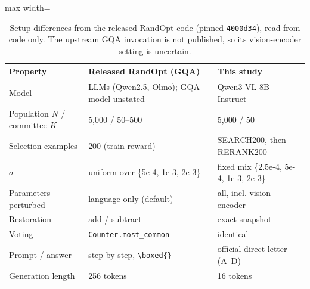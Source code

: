 \begin{table}[t]
\centering
\small
\begin{adjustbox}{max width=\linewidth}
\begin{tabular}{lll}
\toprule
Property & Released RandOpt (GQA) & This study \\
\midrule
Model & LLMs (Qwen2.5, Olmo); GQA model unstated & Qwen3-VL-8B-Instruct \\
Population $N$ / committee $K$ & 5,000 / 50--500 & 5,000 / 50 \\
Selection examples & 200 (train reward) & SEARCH200, then RERANK200 \\
$\sigma$ & uniform over \{5e-4, 1e-3, 2e-3\} & fixed mix \{2.5e-4, 5e-4, 1e-3, 2e-3\} \\
Parameters perturbed & language only (default) & all, incl. vision encoder \\
Restoration & add / subtract & exact snapshot \\
Voting & \texttt{Counter.most\_common} & identical \\
Prompt / answer & step-by-step, \texttt{\textbackslash boxed\{\}} & official direct letter (A--D) \\
Generation length & 256 tokens & 16 tokens \\
\bottomrule
\end{tabular}
\end{adjustbox}
\caption{Setup differences from the released RandOpt code (pinned \texttt{4000d34}), read from code only. The upstream GQA invocation is not published, so its vision-encoder setting is uncertain.}
\label{tab:setup}
\end{table}
